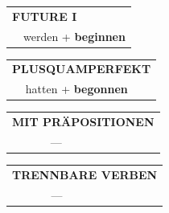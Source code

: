\documentclass[10pt,a4paper]{revtex4-2}
\begin{document}
\begin{verbbox-acc}
\begin{tabular}{rl}
    \multicolumn{2}{l}{\textbf{FUTURE I} }\\
  &  werden + \textbf{beginnen}\\
 
  \end{tabular}
\hfill
   \begin{tabular}{rl}
      \multicolumn{2}{l}{\textbf{PLUSQUAMPERFEKT}}\\
   & hatten + \textbf{begonnen}\\
  \end{tabular}
  
\vspace{10pt}

\begin{tabular}{lll}
\multicolumn{3}{l}{\textbf{MIT PRÄPOSITIONEN}}\\
& ---\\
\end{tabular}
\hfill
\begin{tabular}{lll}
\multicolumn{3}{l}{\textbf{TRENNBARE VERBEN}}\\
& ---\\
\end{tabular}

\vspace{-5pt}

\end{verbbox-acc}
\end{document}
